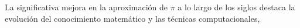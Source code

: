 \documentclass[preview]{standalone}
\begin{document}
\begin{center}
La significativa mejora en la aproximación de $\pi$ a lo largo de los siglos destaca la evolución del conocimiento matemático y las técnicas computacionales,
\end{center}
\end{document}
